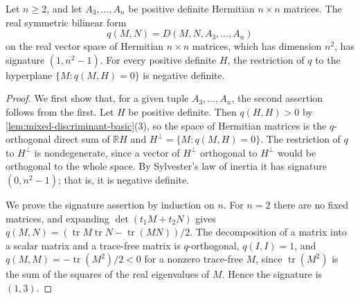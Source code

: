 \begin{lemma}\label{lem:mixed-discriminant-signature}
Let $n\geq2$, and let $A_3,\ldots,A_n$ be positive definite Hermitian $n\times n$ matrices. The real symmetric bilinear form
\[
 q(M,N)=D(M,N,A_3,\ldots,A_n)
\]
on the real vector space of Hermitian $n\times n$ matrices, which has dimension $n^2$, has signature $(1,n^2-1)$. For every positive definite $H$, the restriction of $q$ to the hyperplane $\{M:q(M,H)=0\}$ is negative definite.
\end{lemma}
\begin{proof}
We first show that, for a given tuple $A_3,\ldots,A_n$, the second assertion follows from the first. Let $H$ be positive definite. Then $q(H,H)>0$ by \cref{lem:mixed-discriminant-basic}(3), so the space of Hermitian matrices is the $q$-orthogonal direct sum of $\mathbb RH$ and $H^\perp=\{M:q(M,H)=0\}$. The restriction of $q$ to $H^\perp$ is nondegenerate, since a vector of $H^\perp$ orthogonal to $H^\perp$ would be orthogonal to the whole space. By Sylvester's law of inertia it has signature $(0,n^2-1)$; that is, it is negative definite.

We prove the signature assertion by induction on $n$. For $n=2$ there are no fixed matrices, and expanding $\det(t_1M+t_2N)$ gives $q(M,N)=(\operatorname{tr}M\operatorname{tr}N-\operatorname{tr}(MN))/2$. The decomposition of a matrix into a scalar matrix and a trace-free matrix is $q$-orthogonal, $q(I,I)=1$, and $q(M,M)=-\operatorname{tr}(M^2)/2<0$ for a nonzero trace-free $M$, since $\operatorname{tr}(M^2)$ is the sum of the squares of the real eigenvalues of $M$. Hence the signature is $(1,3)$.


\end{proof}
